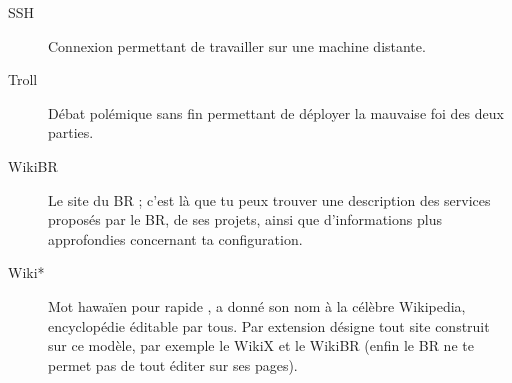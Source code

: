 \begin{description}
  \item[SSH] Connexion permettant de travailler sur une machine distante.
  \item[Troll] Débat polémique sans fin permettant de déployer la mauvaise foi des deux parties.
  \item[WikiBR]  Le site du BR ; c'est là que tu peux trouver une description des services proposés par le BR, de ses projets, ainsi que
  d'informations plus approfondies concernant ta configuration.
  \item[Wiki*] Mot hawaïen pour \og rapide \fg, a donné son nom à la célèbre Wikipedia, encyclopédie éditable par tous.
  Par extension d\'esigne tout site construit sur ce mod\`ele, par exemple le WikiX et le WikiBR (enfin le BR ne te permet pas de tout \'editer sur ses pages).
\end{description}
